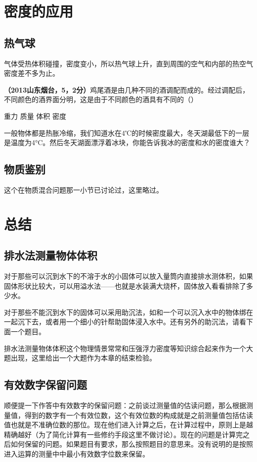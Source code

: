 \documentclass[12pt,twoside]{exam}
\begin{document}
\begin{knowledge}
\section{密度的应用}
\subsection{热气球}
气体受热体积碰撞，密度变小，所以热气球上升，直到周围的空气和内部的热空气密度差不多为止。

\textbf{（2013山东烟台，5，2分）}鸡尾酒是由几种不同的酒调配而成的。经过调配后，不同颜色的酒界面分明，这是由于不同颜色的酒具有不同的（\answerline*[D]）

\begin{oneparchoices}
\choice 重力
\choice 质量
\choice 体积
\choice 密度
\end{oneparchoices}

一般物体都是热胀冷缩，我们知道水在4℃的时候密度最大，冬天湖最低下的一层是温度为4\si{\degreeCelsius}。然后冬天湖面漂浮着冰块，你能告诉我冰的密度和水的密度谁大？

\subsection{物质鉴别}
这个在物质混合问题那一小节已讨论过，这里略过。

\section{总结}
\subsection{排水法测量物体体积}
对于那些可以沉到水下的不溶于水的小固体可以放入量筒内直接排水测体积，如果固体形状比较大，可以用溢水法——也就是水装满大烧杯，固体放入看看排除了多少水。

对于那些不能沉到水下的固体可以采用助沉法，如和一个可以沉入水中的物体绑在一起沉下去，或者用一个细小的针帮助固体浸入水中。还有另外的助沉法，请看下面一个题目。

排水法测量物体体积这个物理情景常常和压强浮力密度等知识综合起来作为一个大题出现，这里给出一个大题作为本章的结束检验。


\subsection{有效数字保留问题}
顺便提一下作答中有效数字的保留问题：之前谈过测量值的估读问题，那么根据测量值，得到的数字有一个有效位数，这个有效位数的构成就是之前测量值包括估读值也就是不准确位数的那位。现在他们进入计算之后，在计算过程中，原则上是越精确越好（为了简化计算有一些修约手段这里不做讨论）。现在的问题是计算完之后如何保留的问题。如果题目有要求，那么按照题目的意思来。没有说明的是按照进入运算的测量中中最小有效数字位数来保留。


\end{knowledge}
\end{document}
